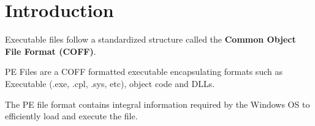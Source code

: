 \section{Introduction}


Executable files follow a standardized structure called the {\bf Common Object File Format (COFF)}.

PE Files are a COFF formatted executable encapsulating formats such as Executable (.exe, .cpl, .sys, etc), object code and DLLs. 

The PE file format contains integral information required by the Windows OS to efficiently load and execute the file.  
